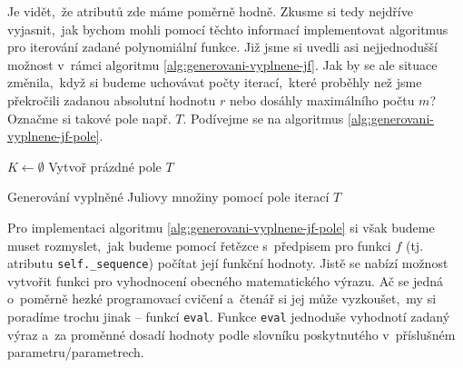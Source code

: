 Je vidět,~že atributů zde máme poměrně hodně. Zkusme si tedy nejdříve vyjasnit,~jak bychom mohli pomocí těchto informací implementovat algoritmus pro iterování zadané polynomiální funkce. Již jsme si uvedli asi nejjednodušší možnost v~rámci algoritmu \ref{alg:generovani-vyplnene-jf}. Jak by se ale situace změnila,~když si budeme uchovávat počty iterací,~které proběhly než jsme překročili zadanou absolutní hodnotu $r$ nebo dosáhly maximálního počtu $m$? Označme si takové pole např. $T$. Podívejme se na algoritmus \ref{alg:generovani-vyplnene-jf-pole}.
\begin{algorithm}[h]
    $K\gets\emptyset$\;
    Vytvoř prázdné pole $T$\;
    \;
    \caption{Generování vyplněné Juliovy množiny pomocí pole iterací $T$}
    \label{alg:generovani-vyplnene-jf-pole}
\end{algorithm}
Pro implementaci algoritmu \ref{alg:generovani-vyplnene-jf-pole} si však budeme muset rozmyslet,~jak budeme pomocí řetězce s~předpisem pro funkci $f$ (tj. atributu \texttt{self.\_sequence}) počítat její funkční hodnoty. Jistě se nabízí možnost vytvořit funkci pro vyhodnocení obecného matematického výrazu. Ač se jedná o~poměrně hezké programovací cvičení a~čtenář si jej může vyzkoušet,~my si poradíme trochu jinak -- funkcí \texttt{eval}. Funkce \texttt{eval} jednoduše vyhodnotí zadaný výraz a~za proměnné dosadí hodnoty podle slovníku poskytnutého v~příslušném parametru/parametrech.

